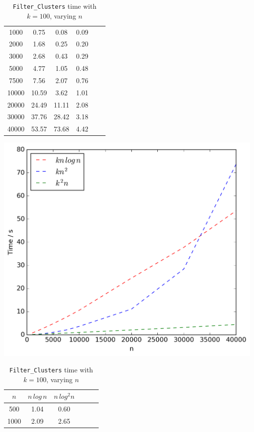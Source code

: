 \documentclass[final,1p,times]{elsarticle}
\begin{document}
\begin{table}[!ht]
\begin{minipage}{0.48\textwidth}
\begin{tabular}{c||ccccc}
                \hline\hline
                1000 & 0.75 & 0.08 & 0.09\\
                2000 & 1.68 & 0.25 & 0.20\\
                3000 & 2.68 & 0.43 & 0.29\\
                5000 & 4.77 & 1.05 & 0.48\\
                7500 & 7.56 & 2.07 & 0.76\\
                10000 & 10.59 & 3.62 & 1.01\\
                20000 & 24.49 & 11.11 & 2.08\\
                30000 & 37.76 & 28.42 & 3.18\\
                40000 & 53.57 & 73.68 & 4.42\\
            \end{tabular}
            \includegraphics[scale=0.4]{varyingn2_weighting}
        \end{minipage}\hfill
        \begin{minipage}{0.48\textwidth}
            \centering
            \caption{\texttt{Filter\_Clusters} time with $k = 100$, varying $n$}
            \label{tab:filtern2}
            \begin{tabular}{c||ccccc}
                $n$ & $n\,log\,n$ & $n\,log^2n$\\
                \hline\hline
                500 & 1.04 & 0.60\\
                1000 & 2.09 & 2.65\\

\end{tabular}
\end{minipage}
\end{table}
\end{document}
